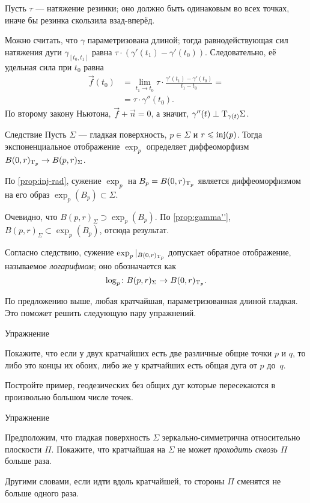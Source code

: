 Пусть $\tau$ --- натяжение резинки;
оно должно быть одинаковым во всех точках, иначе бы резинка скользила взад-вперёд.

Можно считать, что $\gamma$ параметризована длиной;
тогда равнодействующая сил натяжения дуги $\gamma_{[t_0,t_1]}$ равна $\tau\cdot(\gamma'(t_1)-\gamma'(t_0))$.
Следовательно, её удельная сила при $t_0$ равна
\begin{align*}
\vec f(t_0)&=\lim_{t_1\to t_0}\tau\cdot\frac{\gamma'(t_1)-\gamma'(t_0)}{t_1-t_0}=
\\
&=\tau\cdot\gamma''(t_0).
\end{align*}
По второму закону Ньютона,  
$\vec f+\vec n=0$,
а значит, $\gamma''(t)\perp\mathrm{T}_{\gamma(t)}\Sigma$.
\qeds

\begin{thm}{Следствие}
Пусть $\Sigma$ --- гладкая поверхность, $p\in\Sigma$ и $r\z\le \inj(p)$.
Тогда экспоненциальное отображение $\exp_p$ определяет диффеоморфизм $B(0,r)_{\mathrm{T}_p}\to B(p,r)_\Sigma$.
\end{thm}

По \ref{prop:inj-rad}, сужение $\exp_p$ на $B_p={B(0,r)_{\mathrm{T}_p}}$ является диффеоморфизмом на его образ $\exp_p(B_p)\subset \Sigma$.

Очевидно, что $B(p,r)_\Sigma\supset\exp_p(B_p)$.
По \ref{prop:gamma''}, $B(p,r)_\Sigma\subset\exp_p(B_p)$, отсюда результат.
\qeds

{\sloppy

Согласно следствию, сужение $\exp_p|_{B(0,r)_{\mathrm{T}_p}}$ допускает обратное отображение, называемое \emph{логарифмом};
оно обозначается как \[\log_p\colon B(p,r)_\Sigma\to B(0,r)_{\mathrm{T}_p}.\]

}

По предложению выше, любая кратчайшая, параметризованная длиной гладкая.
Это поможет решить следующую пару упражнений.

\begin{thm}{Упражнение}\label{ex:two-min-geod}
{\sloppy
Покажите, что если у двух кратчайших есть две различные общие точки $p$ и $q$, то либо это концы их обоих, либо же у кратчайших есть общая дуга от $p$ до~$q$.

}

Постройте пример, геодезических без общих дуг которые пересекаются в произвольно большом числе точек.
\end{thm}

\begin{thm}{Упражнение}\label{ex:min-geod+plane}
{\sloppy
Предположим, что гладкая поверхность $\Sigma$ зеркально-симметрична относительно плоскости $\Pi$.
Покажите, что кратчайшая на $\Sigma$ не может \emph{проходить сквозь} $\Pi$ больше раза.

}

Другими словами, если идти вдоль кратчайшей, то стороны $\Pi$ сменятся не больше одного раза. 
\end{thm}


